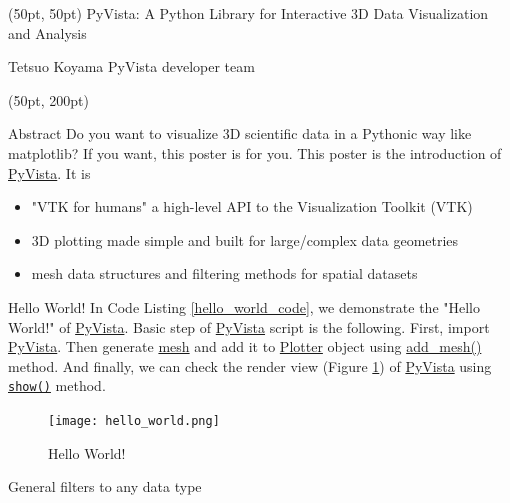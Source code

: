 \documentclass[final]{beamer}
\begin{document}
\begin{frame}[fragile]
\begin{textblock*}{3450pt}(50pt, 50pt)
\Huge PyVista: A Python Library for Interactive 3D Data Visualization and Analysis

\Large Tetsuo Koyama
\small PyVista developer team
\end{textblock*}

\begin{textblock*}{800pt}(50pt, 200pt)
\begin{block}{Abstract}
Do you want to visualize 3D scientific data in a Pythonic way like matplotlib?
If you want, this poster is for you.
This poster is the introduction of \href{https://pypi.org/project/pyvista/}{PyVista}.
It is
\begin{itemize}
\item "VTK for humans"\: a high-level API to the Visualization Toolkit (VTK)
\item 3D plotting made simple and built for large/complex data geometries
\item mesh data structures and filtering methods for spatial datasets
\end{itemize}

\end{block}
\begin{block}{Hello World!}
In Code Listing \ref{hello_world_code}, we demonstrate the "Hello World!" of \href{https://pypi.org/project/pyvista/}{PyVista}.
Basic step of \href{https://pypi.org/project/pyvista/}{PyVista} script is the following.
First, import \href{https://pypi.org/project/pyvista/}{PyVista}.
Then generate \href{https://dev.pyvista.org/getting-started/what-is-a-mesh.html}{mesh} and add it to
\href{https://dev.pyvista.org/plotting/plotting.html#pyvista.Plotter}{Plotter} object using \href{https://dev.pyvista.org/plotting/plotting.html#pyvista.BasePlotter.add\_mesh}{add\_mesh()} method.
And finally, we can check the render view (Figure \ref{HelloWorldFigure}) of \href{https://pypi.org/project/pyvista/}{PyVista} using \href{https://dev.pyvista.org/plotting/plotting.html#pyvista.Plotter.show}{\texttt{show()}} method.


\begin{figure}
\texttt{[image: hello\_world.png]}
\caption{Hello World!\label{HelloWorldFigure}}
\end{figure}
\end{block}
\begin{block}{General filters to any data type}


\end{block}
\end{textblock*}
\end{frame}
\end{document}
